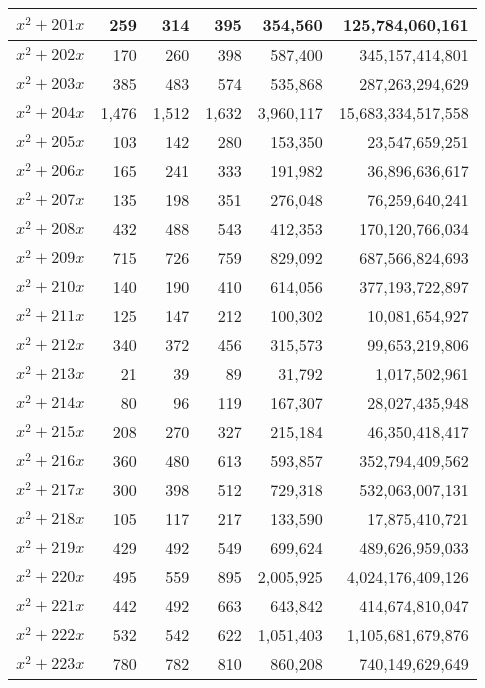 \documentclass[a4paper]{amsproc}
\theoremstyle{plain}
\begin{document}
\begin{longtable}{ | l | r | r | r | r | r | }
$x^2 + 201x$ & 259 & 314 & 395 & 354{,}560 & 125{,}784{,}060{,}161 \\ \hline
$x^2 + 202x$ & 170 & 260 & 398 & 587{,}400 & 345{,}157{,}414{,}801 \\ \hline
$x^2 + 203x$ & 385 & 483 & 574 & 535{,}868 & 287{,}263{,}294{,}629 \\ \hline
$x^2 + 204x$ & 1{,}476 & 1{,}512 & 1{,}632 & 3{,}960{,}117 & 15{,}683{,}334{,}517{,}558 \\ \hline
$x^2 + 205x$ & 103 & 142 & 280 & 153{,}350 & 23{,}547{,}659{,}251 \\ \hline
$x^2 + 206x$ & 165 & 241 & 333 & 191{,}982 & 36{,}896{,}636{,}617 \\ \hline
$x^2 + 207x$ & 135 & 198 & 351 & 276{,}048 & 76{,}259{,}640{,}241 \\ \hline
$x^2 + 208x$ & 432 & 488 & 543 & 412{,}353 & 170{,}120{,}766{,}034 \\ \hline
$x^2 + 209x$ & 715 & 726 & 759 & 829{,}092 & 687{,}566{,}824{,}693 \\ \hline
$x^2 + 210x$ & 140 & 190 & 410 & 614{,}056 & 377{,}193{,}722{,}897 \\ \hline
$x^2 + 211x$ & 125 & 147 & 212 & 100{,}302 & 10{,}081{,}654{,}927 \\ \hline
$x^2 + 212x$ & 340 & 372 & 456 & 315{,}573 & 99{,}653{,}219{,}806 \\ \hline
$x^2 + 213x$ & 21 & 39 & 89 & 31{,}792 & 1{,}017{,}502{,}961 \\ \hline
$x^2 + 214x$ & 80 & 96 & 119 & 167{,}307 & 28{,}027{,}435{,}948 \\ \hline
$x^2 + 215x$ & 208 & 270 & 327 & 215{,}184 & 46{,}350{,}418{,}417 \\ \hline
$x^2 + 216x$ & 360 & 480 & 613 & 593{,}857 & 352{,}794{,}409{,}562 \\ \hline
$x^2 + 217x$ & 300 & 398 & 512 & 729{,}318 & 532{,}063{,}007{,}131 \\ \hline
$x^2 + 218x$ & 105 & 117 & 217 & 133{,}590 & 17{,}875{,}410{,}721 \\ \hline
$x^2 + 219x$ & 429 & 492 & 549 & 699{,}624 & 489{,}626{,}959{,}033 \\ \hline
$x^2 + 220x$ & 495 & 559 & 895 & 2{,}005{,}925 & 4{,}024{,}176{,}409{,}126 \\ \hline
$x^2 + 221x$ & 442 & 492 & 663 & 643{,}842 & 414{,}674{,}810{,}047 \\ \hline
$x^2 + 222x$ & 532 & 542 & 622 & 1{,}051{,}403 & 1{,}105{,}681{,}679{,}876 \\ \hline
$x^2 + 223x$ & 780 & 782 & 810 & 860{,}208 & 740{,}149{,}629{,}649 \\ \hline

\end{longtable}
\end{document}
